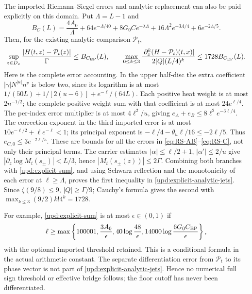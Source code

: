 \documentclass[11pt]{article}
\numberwithin{equation}{section}
\theoremstyle{definition}
\theoremstyle{remark}
\begin{document}
The imported Riemann--Siegel errors and analytic replacement can also
be paid explicitly on this domain. Put $\Lambda=L-1$ and
\begin{equation}
 B_C(L)=\frac{4A_0}{\Lambda}+64e^{-\Lambda/40}
       +8G_0C e^{-\lambda\Lambda}
       +16\Lambda^2e^{-3\Lambda/4}+6e^{-2\Lambda/5}.
 \label{upd:BC-budget}
\end{equation}
Then, for the existing analytic comparison $\mathcal P_t$,
\begin{equation}
 \sup_{z\in D_x}\frac{|H(t,z)-\mathcal P_t(z)|}{\Gamma}
 \le B_{C_{\rm EP}}(L),\qquad
 \max_{0\le k\le3}
 \frac{|\partial_x^k(H-\mathcal P_t)(t,x)|}
                         {2|Q|(L/4)^k}
 \le1728 B_{C_{\rm EP}}(L).
 \label{upd:explicit-analytic-jets}
\end{equation}
Here is the complete error accounting.  In the upper half-disc the
extra coefficient $|\gamma|N^{|\kappa|}n^v$ is below two, since its
logarithm is at most
$1/(50L)+1/[2(u-6)]+e^{-\ell}/(64L)$.
Each positive heat weight is at most $2n^{-1/2}$; the complete positive
weight sum with that coefficient is at most $24e^{\ell/4}$.
The per-index error multiplier is at most $4\ell^2/u$, giving
$e_A+e_B\le8\ell^2e^{-3\ell/4}$.
The correction exponent in the third imported error is at most
$10e^{-\ell/2}+\ell e^{-\ell}<1$; its principal exponent is
$-\ell/4-\theta_u\ell/16\le-2\ell/5$. Thus
$e_{C,0}\le3e^{-2\ell/5}$.  These are bounds for all the errors in
\eqref{eq:RS-AB}--\eqref{eq:RS-C}, not only their principal terms.
The carrier estimates $|\alpha|\le\ell/2+1$, $|\alpha'|\le2/u$
give $|\partial_z\log M_t(s_\pm)|<L/3$, hence
$|M_t(s_\pm(z))|\le2\Gamma$.
Combining both branches with \eqref{upd:explicit-sum}, and using
Schwarz reflection and the monotonicity of each error at
$\ell\ge\Lambda$, proves the first inequality in
\eqref{upd:explicit-analytic-jets}. Since $\zeta(9/8)\le9$,
$|Q|\ge\Gamma/9$; Cauchy's formula gives the second with
$\max_{k\le3}(9/2)k!4^k=1728$.

For example, \eqref{upd:explicit-sum} is at most $\epsilon\in(0,1)$
if
\[
 \ell\ge\max\left\{100001,\frac{3A_0}{\epsilon},
 40\log\frac{48}{\epsilon},
 14000\log\frac{6G_0C_{\rm EP}}{\epsilon}\right\},
\]
with the optional imported threshold retained. This is a conditional
formula in the actual arithmetic constant. The separate differentiation
error from $\mathcal P_t$ to its phase vector is not part of
\eqref{upd:explicit-analytic-jets}.  Hence no numerical full sign
threshold or effective bridge follows; the floor cutoff has never been
differentiated.
\end{document}

